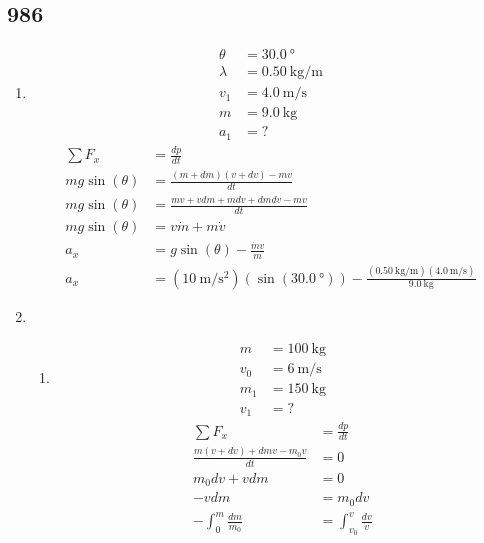 \documentclass{article}
\begin{document}
\subsection{986}

\begin{enumerate}[label = \textbf{(\alph*)}]
	\item
		\begin{align*}
			\theta & = \SI{30.0}{\degree} \\
			\lambda & = \SI{0.50}{\kilogram \per \meter} \\
			v_1 & = \SI{4.0}{\meter \per \second} \\
			m & = \SI{9.0}{\kilogram} \\
			a_1 & = ?
		\end{align*}
		\begin{align*}
			\sum F_x & = \frac{dp}{dt} \\
			mg\sin(\theta) & = \frac{ (m + dm)(v + dv) - mv }{ dt } \\
			mg\sin(\theta) & = \frac{ mv + vdm + mdv + dmdv - mv }{ dt } \\
			mg\sin(\theta) & = v\dot{m} + m\dot{v} \\
			a_x & = g\sin(\theta) - \frac{ \dot{m}v }{ m } \\
			a_x & = (\SI{10}{\meter \per \second \squared})(\sin(\SI{30.0}{\degree})) - \frac{ (\SI{0.50}{\kilogram \per \meter})(\SI{4.0}{\meter \per \second}) }{ \SI{9.0}{\kilogram} }
		\end{align*}
	\item
		\begin{enumerate}[label = \textbf{(\arabic*)}]
			\item
				\begin{align*}
					m & = \SI{100}{\kilogram} \\
					v_0 & = \SI{6}{\meter \per \second} \\
					m_1 & = \SI{150}{\kilogram} \\
					v_1 & = ?
				\end{align*}
				\begin{align*}
					\sum F_x & = \frac{dp}{dt} \\
					\frac{m(v + dv) + dmv - m_0v}{dt} & = 0 \\
					m_0dv + vdm & = 0 \\
					-vdm & = m_0dv \\
					- \int_0^m \frac{dm}{m_0} & = \int_{v_0}^v \frac{dv}{v} \\

\end{align*}
\end{enumerate}
\end{enumerate}
\end{document}
